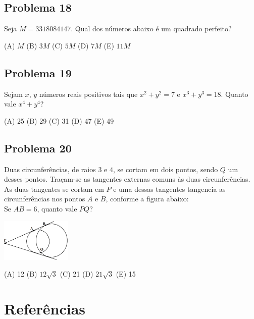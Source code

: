 \documentclass[12pt]{article}
\begin{document}
\subsection{Problema 18}
\begin{tcolorbox}[statementbox]
Seja $M=3318084147$. Qual dos números abaixo é um quadrado perfeito?

(A) $M$ (B) $3M$ (C) $5M$ (D) $7M$ (E) $11M$
\end{tcolorbox}
\clearpage

\subsection{Problema 19}
\begin{tcolorbox}[statementbox]
Sejam $x$, $y$ números reais positivos tais que $x^2+y^2=7$ e $x^3+y^3=18$. Quanto vale $x^4+y^4$?

(A) 25 (B) 29 (C) 31 (D) 47 (E) 49
\end{tcolorbox}
\clearpage

\subsection{Problema 20}
\begin{tcolorbox}[statementbox]
Duas circunferências, de raios $3$ e $4$, se cortam em dois pontos, sendo $Q$ um desses pontos. Traçam-se as tangentes externas comuns às duas circunferências. As duas tangentes se cortam em $P$ e uma dessas tangentes tangencia as circunferências nos pontos $A$ e $B$, conforme a figura abaixo: \\
Se $AB=6$, quanto vale $PQ$?

  \begin{center}
  \includegraphics[width=0.25\textwidth]{fifth.png}
\end{center}


(A) 12 (B) $12\sqrt{3}$ (C) 21 (D) $21\sqrt{3}$ (E) 15
\end{tcolorbox}
\clearpage

  \clearpage

  \section{\textsf{Referências}}
\end{document}
